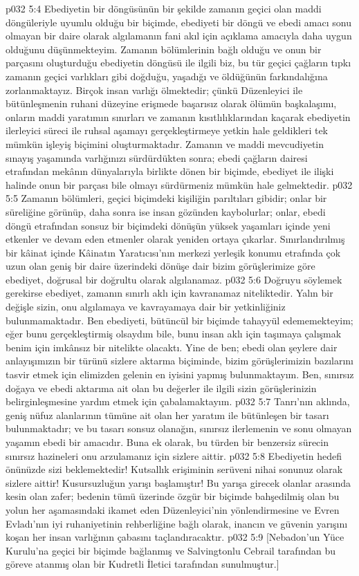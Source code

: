 \vs p032 5:4 Ebediyetin bir döngüsünün bir şekilde zamanın geçici olan maddi döngüleriyle uyumlu olduğu bir biçimde, ebediyeti bir döngü ve ebedi amacı sonu olmayan bir daire olarak algılamanın fani akıl için açıklama amacıyla daha uygun olduğunu düşünmekteyim. Zamanın bölümlerinin bağlı olduğu ve onun bir parçasını oluşturduğu ebediyetin döngüsü ile ilgili biz, bu tür geçici çağların tıpkı zamanın geçici varlıkları gibi doğduğu, yaşadığı ve öldüğünün farkındalığına zorlanmaktayız. Birçok insan varlığı ölmektedir; çünkü Düzenleyici ile bütünleşmenin ruhani düzeyine erişmede başarısız olarak ölümün başkalaşımı, onların maddi yaratımın sınırları ve zamanın kısıtlılıklarından kaçarak ebediyetin ilerleyici süreci ile ruhsal aşamayı gerçekleştirmeye yetkin hale geldikleri tek mümkün işleyiş biçimini oluşturmaktadır. Zamanın ve maddi mevcudiyetin sınayış yaşamında varlığınızı sürdürdükten sonra; ebedi çağların dairesi etrafından mekânın dünyalarıyla birlikte dönen bir biçimde, ebediyet ile ilişki halinde onun bir parçası bile olmayı sürdürmeniz mümkün hale gelmektedir.
\vs p032 5:5 Zamanın bölümleri, geçici biçimdeki kişiliğin parıltıları gibidir; onlar bir süreliğine görünüp, daha sonra ise insan gözünden kaybolurlar; onlar, ebedi döngü etrafından sonsuz bir biçimdeki dönüşün yüksek yaşamları içinde yeni etkenler ve devam eden etmenler olarak yeniden ortaya çıkarlar. Sınırlandırılmış bir kâinat içinde Kâinatın Yaratıcısı’nın merkezi yerleşik konumu etrafında çok uzun olan geniş bir daire üzerindeki dönüşe dair bizim görüşlerimize göre ebediyet, doğrusal bir doğrultu olarak algılanamaz.
\vs p032 5:6 Doğruyu söylemek gerekirse ebediyet, zamanın sınırlı aklı için kavranamaz niteliktedir. Yalın bir değişle sizin, onu algılamaya ve kavrayamaya dair bir yetkinliğiniz bulunmamaktadır. Ben ebediyeti, bütüncül bir biçimde tahayyül edememekteyim; eğer bunu gerçekleştirmiş olsaydım bile, bunu insan aklı için taşımaya çalışmak benim için imkânsız bir nitelikte olacaktı. Yine de ben; ebedi olan şeylere dair anlayışımızın bir türünü sizlere aktarma biçiminde, bizim görüşlerimizin bazılarını tasvir etmek için elimizden gelenin en iyisini yapmış bulunmaktayım. Ben, sınırsız doğaya ve ebedi aktarıma ait olan bu değerler ile ilgili sizin görüşlerinizin belirginleşmesine yardım etmek için çabalamaktayım.
\vs p032 5:7 Tanrı’nın aklında, geniş nüfuz alanlarının tümüne ait olan her yaratım ile bütünleşen bir tasarı bulunmaktadır; ve bu tasarı sonsuz olanağın, sınırsız ilerlemenin ve sonu olmayan yaşamın ebedi bir amacıdır. Buna ek olarak, bu türden bir benzersiz sürecin sınırsız hazineleri onu arzulamanız için sizlere aittir.
\vs p032 5:8 Ebediyetin hedefi önünüzde sizi beklemektedir! Kutsallık erişiminin serüveni nihai sonunuz olarak sizlere aittir! Kusursuzluğun yarışı başlamıştır! Bu yarışa girecek olanlar arasında kesin olan zafer; bedenin tümü üzerinde özgür bir biçimde bahşedilmiş olan bu yolun her aşamasındaki ikamet eden Düzenleyici’nin yönlendirmesine ve Evren Evladı’nın iyi ruhaniyetinin rehberliğine bağlı olarak, inancın ve güvenin yarışını koşan her insan varlığının çabasını taçlandıracaktır.
\vs p032 5:9 [Nebadon’un Yüce Kurulu’na geçici bir biçimde bağlanmış ve Salvingtonlu Cebrail tarafından bu göreve atanmış olan bir Kudretli İletici tarafından sunulmuştur.]
